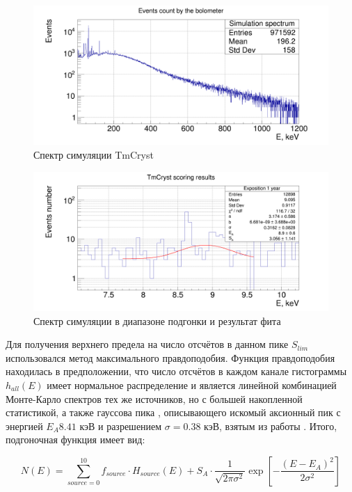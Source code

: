 \documentclass[a4paper,article,14pt]{extarticle}
\begin{document}
\begin{figure}[h!]
    \centering
    \includegraphics[width = \textwidth]{images/SpectrumTmCryst.png}
    \caption{Спектр симуляции TmCryst}
   \label{hist_all}
 \end{figure}

\begin{figure}[h!]
    \centering
    \includegraphics[width = \textwidth]{images/AxionFit.png}
    \caption{Спектр симуляции в диапазоне подгонки и результат фита}
   \label{AxionFit}
 \end{figure}
Для получения верхнего предела на число отсчётов в данном пике $S_{lim}$ использовался метод максимального правдоподобия. Функция правдоподобия находилась в предположении, что число отсчётов в каждом канале гистограммы $h_{all} \left( E \right)$ имеет нормальное распределение и является линейной комбинацией Монте-Карло спектров тех же источников, но с большей накопленной статистикой, а также гауссова пика , описывающего искомый аксионный пик с энергией $E_A 8.41 \text{ кэВ}$ и разрешением $\sigma = 0.38 \text{ кэВ}$, взятым из работы \cite{test_bolometric_tm}. Итого, подгоночная функция имеет вид:

\begin{equation}
    N\left( E \right) = \sum\limits_{source = 0}^{10} {{f_{source}} \cdot {H_{source}}\left( E \right)}  + {S_A} \cdot \frac{1}{{\sqrt {2\pi {\sigma ^2}} }}\exp \left[ { - \frac{{{{\left( {E - {E_A}} \right)}^2}}}{{2{\sigma ^2}}}} \right]
\end{equation}
\end{document}
